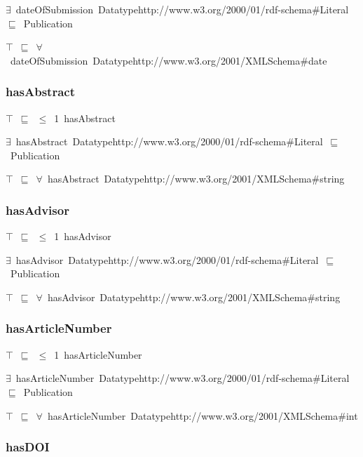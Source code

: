 \documentclass{article}
\begin{document}
\ensuremath{\exists}~dateOfSubmission~Datatypehttp://www.w3.org/2000/01/rdf-schema#Literal~\ensuremath{\sqsubseteq}~Publication

\ensuremath{\top}~\ensuremath{\sqsubseteq}~\ensuremath{\forall}~dateOfSubmission~Datatypehttp://www.w3.org/2001/XMLSchema#date

\subsubsection*{hasAbstract}

\ensuremath{\top}~\ensuremath{\sqsubseteq}~\ensuremath{\leq}~1~hasAbstract

\ensuremath{\exists}~hasAbstract~Datatypehttp://www.w3.org/2000/01/rdf-schema#Literal~\ensuremath{\sqsubseteq}~Publication

\ensuremath{\top}~\ensuremath{\sqsubseteq}~\ensuremath{\forall}~hasAbstract~Datatypehttp://www.w3.org/2001/XMLSchema#string

\subsubsection*{hasAdvisor}

\ensuremath{\top}~\ensuremath{\sqsubseteq}~\ensuremath{\leq}~1~hasAdvisor

\ensuremath{\exists}~hasAdvisor~Datatypehttp://www.w3.org/2000/01/rdf-schema#Literal~\ensuremath{\sqsubseteq}~Publication

\ensuremath{\top}~\ensuremath{\sqsubseteq}~\ensuremath{\forall}~hasAdvisor~Datatypehttp://www.w3.org/2001/XMLSchema#string

\subsubsection*{hasArticleNumber}

\ensuremath{\top}~\ensuremath{\sqsubseteq}~\ensuremath{\leq}~1~hasArticleNumber

\ensuremath{\exists}~hasArticleNumber~Datatypehttp://www.w3.org/2000/01/rdf-schema#Literal~\ensuremath{\sqsubseteq}~Publication

\ensuremath{\top}~\ensuremath{\sqsubseteq}~\ensuremath{\forall}~hasArticleNumber~Datatypehttp://www.w3.org/2001/XMLSchema#int

\subsubsection*{hasDOI}
\end{document}
